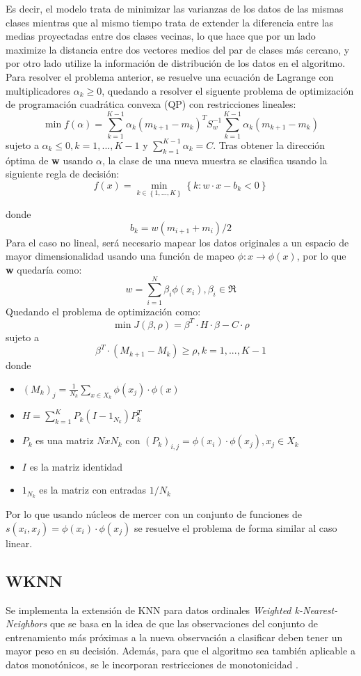 	Es decir, el modelo trata de minimizar las varianzas de los datos de las mismas clases mientras que al mismo tiempo trata de extender la diferencia entre las medias proyectadas entre dos clases vecinas, lo que hace que por un lado maximize la distancia entre dos vectores medios del par de clases más cercano, y por otro lado utilize la información de distribución de los datos en el algoritmo. \newline
	Para resolver el problema anterior, se resuelve una ecuación de Lagrange con multiplicadores $\alpha_k \geq 0$, quedando a resolver el siguente problema de optimización de programación cuadrática convexa (QP) con restricciones lineales:
	$$\min f(\alpha)=\sum_{k=1}^{K-1} \alpha_k(m_{k+1}-m_k)^T S_w^{-1} \sum_{k=1}^{K-1} \alpha_k (m_{k+1}-m_k)$$
	sujeto a $ \alpha_{k} \leq 0, k=1,...,K-1$ y $\sum_{k=1}^{K-1}\alpha_{k}=C$.
	Tras obtener la dirección óptima de \textbf{w} usando $\alpha$, la clase de una nueva muestra se clasifica usando la siguiente regla de decisión:
	$$f(x)=\min_{k \in \left\{ 1,...,K \right\}} \left\{ k:w \cdot x - b_k < 0  \right\}$$
	
	donde $$b_k=w(m_{i+1}+m_i)/2$$
	Para el caso no lineal, será necesario mapear los datos originales a un espacio de mayor dimensionalidad usando una función de mapeo $ \phi : x \rightarrow \phi(x)$, por lo que \textbf{w} quedaría como:
	$$w=\sum_{i=1}^{N} \beta_i \phi(x_i), \beta_i \in \Re$$
	Quedando el problema de optimización como:
	$$\min J(\beta,\rho)=\beta^T \cdot H \cdot \beta - C \cdot  \rho$$
	sujeto a $$ \beta^T \cdot (M_{k+1}-M_k) \geq \rho, k=1,...,K-1$$
	donde
	\begin{itemize}
		\item $(M_k)_j= \frac{1}{N_k} \sum_{x \in X_k} \phi(x_j) \cdot \phi(x)$
		\item $H=\sum_{k=1}^{K}P_k(I-1_{N_k})P_k^T$
		\item $P_k$ es una matriz $N x N_k$ con $(P_k)_{i,j}=\phi(x_i) \cdot \phi(x_j), x_j \in X_k$
		\item $I$ es la matriz identidad
		\item $1_{N_k}$ es la matriz con entradas $1/N_k$ 
	\end{itemize}
	Por lo que usando núcleos de mercer con un conjunto de funciones de $s(x_i,x_j)=\phi(x_i) \cdot \phi(x_j)$ se resuelve el problema de forma similar al caso linear.
\subsection{WKNN}
Se implementa la extensión de KNN para datos ordinales 
\textit{Weighted k-Nearest-Neighbors} \cite{hechenbichler2004weighted} que se basa en la idea de que las observaciones del conjunto de entrenamiento más próximas a la nueva observación a clasificar deben tener un mayor peso en su decisión. Además, para que el algoritmo sea también aplicable a datos monotónicos, se le incorporan restricciones de monotonicidad \cite{duivesteijn2008nearest}.

